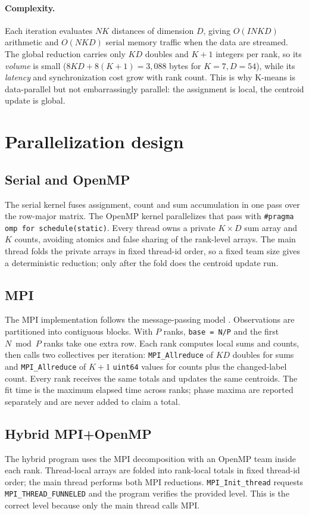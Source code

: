 \documentclass[10pt,a4paper]{article}
\newcommand{\code}[1]{\texttt{#1}}
\begin{document}
\paragraph{Complexity.}
Each iteration evaluates $N K$ distances of dimension $D$, giving
$O(I N K D)$ arithmetic and $O(NKD)$ serial memory traffic when the data are
streamed. The global reduction carries only $K D$ doubles and $K+1$ integers
per rank, so its \emph{volume} is small ($8KD+8(K+1)=3{,}088$ bytes for
$K=7,D=54$), while its \emph{latency} and synchronization cost grow with rank
count. This is why K-means is data-parallel but not embarrassingly parallel:
the assignment is local, the centroid update is global.

\section{Parallelization design}
\subsection{Serial and OpenMP}
The serial kernel fuses assignment, count and sum accumulation in one pass over
the row-major matrix. The OpenMP \citep{dagum1998} kernel parallelizes that pass with
\code{\#pragma omp for schedule(static)}. Every thread owns a private
$K\times D$ sum array and $K$ counts, avoiding atomics and false sharing of the
rank-level arrays. The main thread folds the private arrays in fixed thread-id
order, so a fixed team size gives a deterministic reduction; only after the
fold does the centroid update run.

\subsection{MPI}
The MPI implementation follows the message-passing model \citep{mpiforum2015}. Observations are partitioned into contiguous blocks. With $P$ ranks,
\code{base = N/P} and the first $N\bmod P$ ranks take one extra row. Each rank
computes local sums and counts, then calls two collectives per iteration:
\code{MPI\_Allreduce} of $K D$ doubles for sums and \code{MPI\_Allreduce} of
$K+1$ \code{uint64} values for counts plus the changed-label count. Every rank
receives the same totals and updates the same centroids. The fit time is the
maximum elapsed time across ranks; phase maxima are reported separately and are
never added to claim a total.

\subsection{Hybrid MPI+OpenMP}
The hybrid program uses the MPI decomposition with an OpenMP team inside each
rank. Thread-local arrays are folded into rank-local totals in fixed thread-id
order; the main thread performs both MPI reductions. \code{MPI\_Init\_thread}
requests \code{MPI\_THREAD\_FUNNELED} and the program verifies the provided
level. This is the correct level because only the main thread calls MPI.
\end{document}
